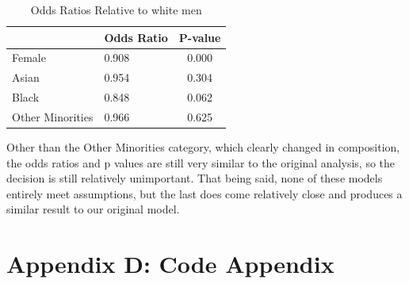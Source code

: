 \documentclass[]{article}
\begin{document}
\begin{table}[H]

\caption{\label{tab:odds_ratios2}Odds Ratios Relative to white men}
\centering
\fontsize{12}{14}\selectfont
\begin{tabular}[t]{l|l|c}
\hline
  & Odds Ratio & P-value\\
\hline
Female & 0.908 & 0.000\\
\hline
Asian & 0.954 & 0.304\\
\hline
Black & 0.848 & 0.062\\
\hline
Other Minorities & 0.966 & 0.625\\
\hline
\end{tabular}
\end{table}

Other than the Other Minorities category, which clearly changed in
composition, the odds ratios and p values are still very similar to the
original analysis, so the decision is still relatively unimportant. That
being said, none of these models entirely meet assumptions, but the last
does come relatively close and produces a similar result to our original
model.

\newpage

\section{Appendix D: Code Appendix}\label{appendix-d-code-appendix}
\end{document}
